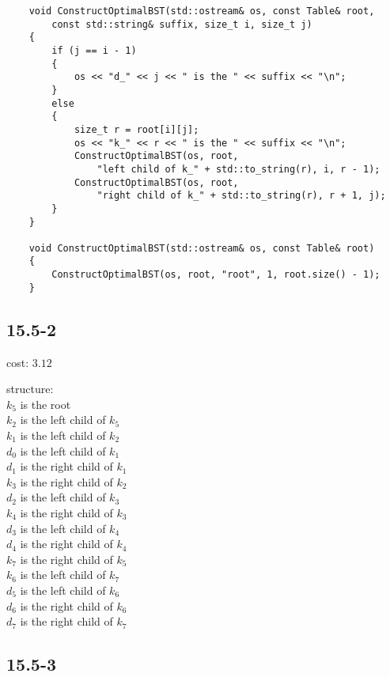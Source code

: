 \begin{verbatim}
    void ConstructOptimalBST(std::ostream& os, const Table& root, 
        const std::string& suffix, size_t i, size_t j)
    {
        if (j == i - 1)
        {
            os << "d_" << j << " is the " << suffix << "\n";
        }
        else
        {
            size_t r = root[i][j];
            os << "k_" << r << " is the " << suffix << "\n";
            ConstructOptimalBST(os, root, 
                "left child of k_" + std::to_string(r), i, r - 1);
            ConstructOptimalBST(os, root, 
                "right child of k_" + std::to_string(r), r + 1, j);
        }
    }

    void ConstructOptimalBST(std::ostream& os, const Table& root)
    {
        ConstructOptimalBST(os, root, "root", 1, root.size() - 1);
    }
\end{verbatim}

\subsection*{15.5-2}

\noindent
cost: $3.12$

\noindent
structure:\\
$k_5$ is the root\\
$k_2$ is the left child of $k_5$\\
$k_1$ is the left child of $k_2$\\
$d_0$ is the left child of $k_1$\\
$d_1$ is the right child of $k_1$\\
$k_3$ is the right child of $k_2$\\
$d_2$ is the left child of $k_3$\\
$k_4$ is the right child of $k_3$\\
$d_3$ is the left child of $k_4$\\
$d_4$ is the right child of $k_4$\\
$k_7$ is the right child of $k_5$\\
$k_6$ is the left child of $k_7$\\
$d_5$ is the left child of $k_6$\\
$d_6$ is the right child of $k_6$\\
$d_7$ is the right child of $k_7$

\subsection*{15.5-3}


